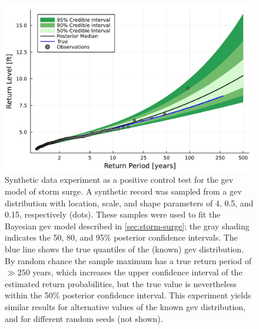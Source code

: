 \documentclass[11pt]{article}
\begin{document}
\begin{figure}
    \centering
    \includegraphics[width=\textwidth]{surge-synthetic-data-experiment}
    \caption{
        Synthetic data experiment as a positive control test for the \gls{gev} model of storm surge.
        A synthetic record was sampled from a \gls{gev} distribution with location, scale, and shape parameters of 4, 0.5, and 0.15, respectively (dots).
        These samples were used to fit the Bayesian \gls{gev} model described in \cref{sec:storm-surge}; the gray shading indicates the 50, 80, and 95\% posterior confidence intervals.
        The blue line shows the true quantiles of the (known) \gls{gev} distribution.
        By random chance the sample maximum has a true return period of $\gg 250$ years, which increases the upper confidence interval of the estimated return probabilities, but the true value is nevertheless within the 50\% posterior confidence interval.
        This experiment yields similar results for alternative values of the known \gls{gev} distribution, and for different random seeds (not shown).
    }\label{fig:surge-synthetic-data-experiment}
\end{figure}
\end{document}
